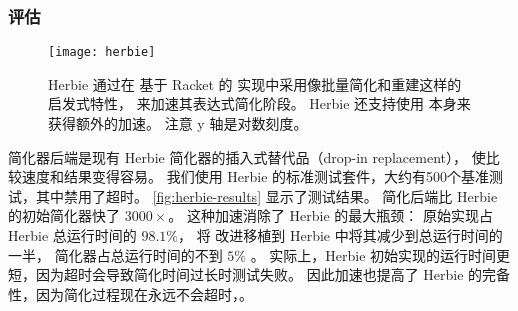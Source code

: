 \subsubsection{评估}

\begin{figure}
  \centering
  \texttt{[image: herbie]}
  \caption{
    Herbie 通过在 基于 Racket 的 \egraph 实现中采用像批量简化和重建这样的 \egg 启发式特性，%
      来加速其表达式简化阶段。
    Herbie 还支持使用 \egg 本身来获得额外的加速。
    注意 y 轴是对数刻度。
  }
  \label{fig:herbie-results}
\end{figure}


\egg 简化器后端是现有 Herbie 简化器的插入式替代品（drop-in replacement），
  使比较速度和结果变得容易。
我们使用 Herbie 的标准测试套件，大约有500个基准测试，其中禁用了超时。
\autoref{fig:herbie-results} 显示了测试结果。
\egg 简化后端比 Herbie 的初始简化器快了 $3000\times$。
这种加速消除了 Herbie 的最大瓶颈：
  原始实现占 Herbie 总运行时间的 $98.1\%$，
  将 \egg 改进移植到 Herbie 中将其减少到总运行时间的一半，
  \egg 简化器占总运行时间的不到 $5\%$ 。
实际上，Herbie 初始实现的运行时间更短，因为超时会导致简化时间过长时测试失败。
因此加速也提高了 Herbie 的完备性，因为简化过程现在永远不会超时，。


